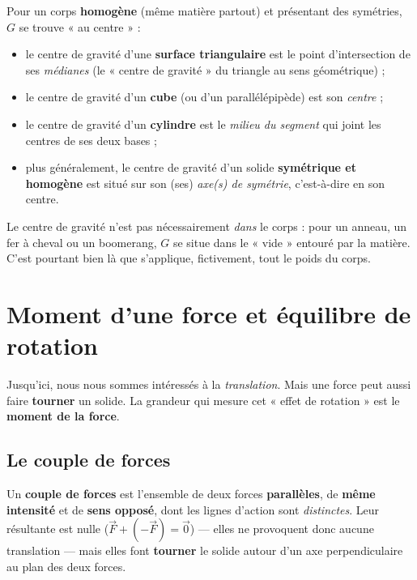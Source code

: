 \documentclass[11pt,a4paper]{article}
\newcommand{\vv}[1]{\vec{#1}}
\begin{document}
\begin{remarque}
Pour un corps \textbf{homogène} (même matière partout) et présentant des symétries, $G$ se trouve
« au centre » :
\begin{itemize}[leftmargin=1.6em,topsep=2pt,itemsep=1.5pt]
  \item le centre de gravité d'une \textbf{surface triangulaire} est le point d'intersection de ses
        \emph{médianes} (le « centre de gravité » du triangle au sens géométrique) ;
  \item le centre de gravité d'un \textbf{cube} (ou d'un parallélépipède) est son \emph{centre} ;
  \item le centre de gravité d'un \textbf{cylindre} est le \emph{milieu du segment} qui joint les
        centres de ses deux bases ;
  \item plus généralement, le centre de gravité d'un solide \textbf{symétrique et homogène} est
        situé sur son (ses) \emph{axe(s) de symétrie}, c'est-à-dire en son centre.
\end{itemize}
\end{remarque}

\begin{attention}
Le centre de gravité n'est pas nécessairement \emph{dans} le corps : pour un anneau, un fer à
cheval ou un boomerang, $G$ se situe dans le « vide » entouré par la matière. C'est pourtant bien
là que s'applique, fictivement, tout le poids du corps.
\end{attention}

\section{Moment d'une force et équilibre de rotation}
Jusqu'ici, nous nous sommes intéressés à la \emph{translation}. Mais une force peut aussi faire
\textbf{tourner} un solide. La grandeur qui mesure cet « effet de rotation » est le \textbf{moment de
la force}.

\subsection{Le couple de forces}
\begin{definition}
Un \textbf{couple de forces} est l'ensemble de deux forces \textbf{parallèles}, de \textbf{même
intensité} et de \textbf{sens opposé}, dont les lignes d'action sont \emph{distinctes}. Leur résultante
est nulle ($\vv F + (-\vv F) = \vv 0$) — elles ne provoquent donc aucune translation — mais elles
font \textbf{tourner} le solide autour d'un axe perpendiculaire au plan des deux forces.
\end{definition}
\end{document}
